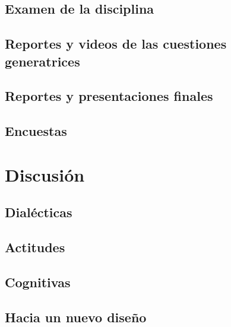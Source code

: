 \documentclass[12pt,spanish,]{book}
\begin{document}
\hypertarget{examen-de-la-disciplina}{%
\section{Examen de la disciplina}\label{examen-de-la-disciplina}}

\hypertarget{reportes-y-videos-de-las-cuestiones-generatrices}{%
\section{Reportes y videos de las cuestiones generatrices}\label{reportes-y-videos-de-las-cuestiones-generatrices}}

\hypertarget{reportes-y-presentaciones-finales}{%
\section{Reportes y presentaciones finales}\label{reportes-y-presentaciones-finales}}

\hypertarget{encuestas}{%
\section{Encuestas}\label{encuestas}}

\hypertarget{discusiuxf3n}{%
\chapter{Discusión}\label{discusiuxf3n}}

\hypertarget{dialuxe9cticas-1}{%
\section{Dialécticas}\label{dialuxe9cticas-1}}

\hypertarget{actitudes-1}{%
\section{Actitudes}\label{actitudes-1}}

\hypertarget{cognitivas}{%
\section{Cognitivas}\label{cognitivas}}

\hypertarget{hacia-un-nuevo-diseuxf1o}{%
\section{Hacia un nuevo diseño}\label{hacia-un-nuevo-diseuxf1o}}


\end{document}
